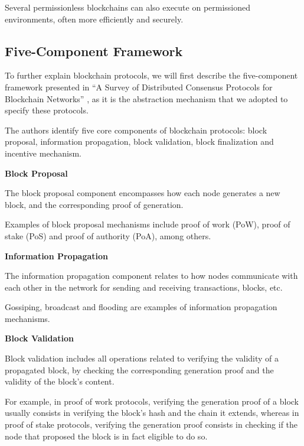 Several permissionless blockchains can also execute on permissioned environments, often more efficiently and securely.

\subsection{Five-Component Framework}

To further explain blockchain protocols, we will first describe the five-component framework presented in “A Survey of Distributed Consensus Protocols for Blockchain Networks” \cite{survey_bchain_networks}, as it is the abstraction mechanism that we adopted to specify these protocols.

The authors identify five core components of blockchain protocols: block proposal, information propagation, block validation, block finalization and incentive mechanism.

\vspace{0.5cm}

\textbf{Block Proposal}

The block proposal component encompasses how each node generates a new block, and the corresponding proof of generation.

Examples of block proposal mechanisms include proof of work (PoW), proof of stake (PoS) and proof of authority (PoA), among others.

\vspace{0.25cm}


\textbf{Information Propagation}

The information propagation component relates to how nodes communicate with each other in the network for sending and receiving transactions, blocks, etc.

Gossiping, broadcast and flooding are examples of information propagation mechanisms.

\vspace{0.25cm}

\textbf{Block Validation}

Block validation includes all operations related to verifying the validity of a propagated block, by checking the corresponding generation proof and the validity of the block’s content.

For example, in proof of work protocols, verifying the generation proof of a block usually consists in verifying the block’s hash and the chain it extends, whereas in proof of stake protocols, verifying the generation proof consists in checking if the node that proposed the block is in fact eligible to do so.

